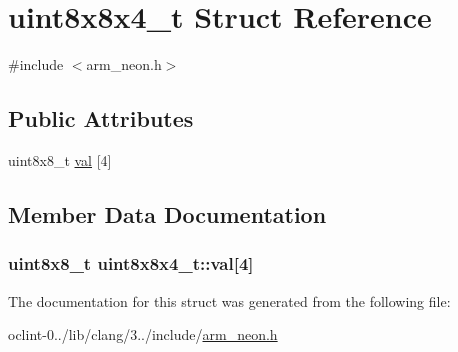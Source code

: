 \hypertarget{structuint8x8x4__t}{\section{uint8x8x4\-\_\-t Struct Reference}
\label{structuint8x8x4__t}
}


{\ttfamily \#include $<$arm\-\_\-neon.\-h$>$}

\subsection*{Public Attributes}
\begin{DoxyCompactItemize}
\item 
uint8x8\-\_\-t \hyperlink{structuint8x8x4__t_a59d59f8ccc3518b30b8d260e28a4b38e}{val} \mbox{[}4\mbox{]}
\end{DoxyCompactItemize}


\subsection{Member Data Documentation}
\hypertarget{structuint8x8x4__t_a59d59f8ccc3518b30b8d260e28a4b38e}{
\subsubsection[{val}]{\setlength{\rightskip}{0pt plus 5cm}uint8x8\-\_\-t uint8x8x4\-\_\-t\-::val\mbox{[}4\mbox{]}}}\label{structuint8x8x4__t_a59d59f8ccc3518b30b8d260e28a4b38e}


The documentation for this struct was generated from the following file\-:\begin{DoxyCompactItemize}
\item 
oclint-\/0../lib/clang/3../include/\hyperlink{arm__neon_8h}{arm\-\_\-neon.\-h}\end{DoxyCompactItemize}
